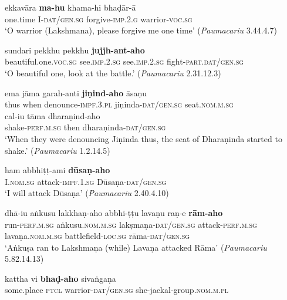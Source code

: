 \documentclass[output=paper,
modfonts
]{LSP/langsci}
\begin{document}
\begin{exe}
\ex\label{ex:cde}
\begin{xlist}
\ex\gll ekkavāra \textbf{ma-hu} khama-hi bhaḍār-ā \\
one.time I-\textsc{dat/gen.sg} forgive-\textsc{imp.2.g} warrior-\textsc{voc.sg} \\
\glt `O warrior (Lakshmana), please forgive me one time' (\textit{Paumacariu} 3.44.4.7)

\ex\label{ex:sundari}\gll sundari pekkhu pekkhu \textbf{jujjh-ant-aho} \\
beautiful.one.\textsc{voc.sg} see.\textsc{imp.2.sg} see.\textsc{imp.2.sg} fight-\textsc{part.dat/gen.sg} \\
\glt `O beautiful one, look at the battle.' (\textit{Paumacariu} 2.31.12.3)

\ex\gll ema jāma garah-anti \textbf{jiṇind-aho}  āsaṇu \\
thus when denounce-\textsc{impf.3.pl} jiṇinda-\textsc{dat/gen.sg} seat.\textsc{nom.m.sg} \\

\gll cal-iu tāma dharaṇind-aho \\
shake-\textsc{perf.m.sg} then dharaṇinda-\textsc{dat/gen.sg} \\
\glt `When they were denouncing Jiṇinda thus, the seat of Dharaṇinda started to shake.' (\textit{Paumacariu} 1.2.14.5)

\ex\gll ham abbhiṭṭ-ami \textbf{dūsaṇ-aho} \\
I.\textsc{nom.sg} attack-\textsc{impf.1.sg} Dūsaṇa-\textsc{dat/gen.sg} \\
\glt `I will attack Dūsaṇa' (\textit{Paumacariu} 2.40.4.10)
\end{xlist}


\ex\label{ex:fgh}
\begin{xlist}
\ex\gll dhā-iu aṅkusu lakkhaṇ-aho    abbhi-ṭṭu lavaṇu raṇ-e \textbf{rām-aho} \\
run-\textsc{perf.m.sg} aṅkusu.\textsc{nom.m.sg} lakṣmaṇa-\textsc{dat/gen.sg} attack-\textsc{perf.m.sg} lavaṇa.\textsc{nom.m.sg} battlefield-\textsc{loc.sg} rāma-\textsc{dat/gen.sg} \\
\glt `Aṅkuṣa ran to Lakshmaṇa (while) Lavaṇa attacked Rāma' (\textit{Paumacariu} 5.82.14.13)

\ex\gll kattha vi \textbf{bhaḍ-aho} sivaṅgaṇa \\
some.place \textsc{ptcl} warrior-\textsc{dat/gen.sg} she-jackal-group.\textsc{nom.m.pl} \\


\end{xlist}
\end{exe}
\end{document}
